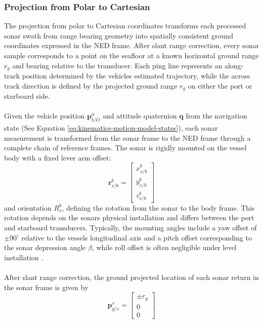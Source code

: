 \subsubsection{Projection from Polar to Cartesian}
The projection from polar to Cartesian coordinates transforms each processed sonar swath from range bearing geometry into spatially consistent ground coordinates expressed in the NED frame. After slant range correction, every sonar sample corresponds to a point on the seafloor at a known horizontal ground range $r_g$ and bearing relative to the transducer. Each ping line represents an along-track position determined by the vehicles estimated trajectory, while the across track direction is defined by the projected ground range $r_g$ on either the port or starboard side.  
\\ \\
Given the vehicle position $\mathbf{p}_{b/O}^{n}$ and attitude quaternion $\mathbf{q}$ from the navigation state (See Equation \ref{eq:kinematics-motion-model-states}), each sonar measurement is transformed from the sonar frame to the NED frame through a complete chain of reference frames. The sonar is rigidly mounted on the vessel body with a fixed lever arm offset:
\begin{equation}
    \mathbf{r}_{s/b}^{b} =
    \begin{bmatrix}
        x_{s/b}^{b} \\ y_{s/b}^{b} \\ z_{s/b}^{b}
    \end{bmatrix}
    \label{eq:local-map-generation-sonar-mounting-lever-arm}
\end{equation}
and orientation $R_s^b$, defining the rotation from the sonar to the body frame. This rotation depends on the sonars physical installation and differs between the port and starboard transducers. Typically, the mounting angles include a yaw offset of $\pm 90^{\circ}$ relative to the vessels longitudinal axis and a pitch offset corresponding to the sonar depression angle $\beta$, while roll offset is often negligible under level installation \cite{side_scan_sonar_master_thesis,side_scan_sonar_paper}.  
\\ \\
After slant range correction, the ground projected location of each sonar return in the sonar frame is given by
$$
    \mathbf{p}_{g/s}^{s} =
    \begin{bmatrix}
        \pm r_g \\ 0 \\ 0
    \end{bmatrix}
$$
